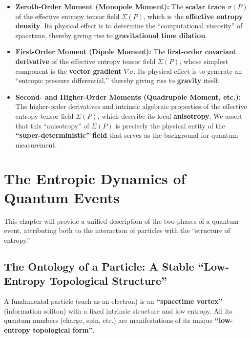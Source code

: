 \documentclass[11pt]{article}
\begin{document}
\begin{itemize}
    \item \textbf{Zeroth-Order Moment (Monopole Moment):} The \textbf{scalar trace $\sigma(P)$} of the effective entropy tensor field $\Sigma(P)$, which is the \textbf{effective entropy density}. Its physical effect is to determine the ``computational viscosity'' of spacetime, thereby giving rise to \textbf{gravitational time dilation}.
    
    \item \textbf{First-Order Moment (Dipole Moment):} The \textbf{first-order covariant derivative} of the effective entropy tensor field $\Sigma(P)$, whose simplest component is the \textbf{vector gradient $\nabla\sigma$}. Its physical effect is to generate an ``entropic pressure differential,'' thereby giving rise to \textbf{gravity} itself.
    
    \item \textbf{Second- and Higher-Order Moments (Quadrupole Moment, etc.):} The higher-order derivatives and intrinsic algebraic properties of the effective entropy tensor field $\Sigma(P)$, which describe its local \textbf{anisotropy}. We assert that this ``anisotropy'' of $\Sigma(P)$ is precisely the physical entity of the \textbf{``super-deterministic'' field} that serves as the background for quantum measurement.
\end{itemize}


\section{The Entropic Dynamics of Quantum Events}

This chapter will provide a unified description of the two phases of a quantum event, attributing both to the interaction of particles with the ``structure of entropy.''

\subsection{The Ontology of a Particle: A Stable ``Low-Entropy Topological Structure''}
A fundamental particle (such as an electron) is an \textbf{``spacetime vortex''} (information soliton) with a fixed intrinsic structure and low entropy. All its quantum numbers (charge, spin, etc.) are manifestations of its unique \textbf{``low-entropy topological form''}.
\end{document}
